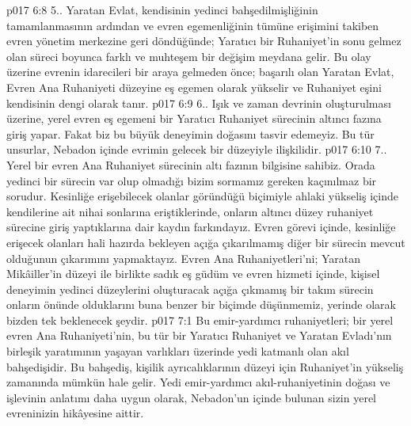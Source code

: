 \vs p017 6:8 5.\bibnobreakspace {}. Yaratan Evlat, kendisinin yedinci bahşedilmişliğinin tamamlanmasının ardından ve evren egemenliğinin tümüne erişimini takiben evren yönetim merkezine geri döndüğünde; Yaratıcı bir Ruhaniyet’in sonu gelmez olan süreci boyunca farklı ve muhteşem bir değişim meydana gelir. Bu olay üzerine evrenin idarecileri bir araya gelmeden önce; başarılı olan Yaratan Evlat, Evren Ana Ruhaniyeti düzeyine eş egemen olarak yükselir ve Ruhaniyet eşini kendisinin dengi olarak tanır.
\vs p017 6:9 6.\bibnobreakspace {}. Işık ve zaman devrinin oluşturulması üzerine, yerel evren eş egemeni bir Yaratıcı Ruhaniyet sürecinin altıncı fazına giriş yapar. Fakat biz bu büyük deneyimin doğasını tasvir edemeyiz. Bu tür unsurlar, Nebadon içinde evrimin gelecek bir düzeyiyle ilişkilidir.
\vs p017 6:10 7.\bibnobreakspace {}. Yerel bir evren Ana Ruhaniyet sürecinin altı fazının bilgisine sahibiz. Orada yedinci bir sürecin var olup olmadığı bizim sormamız gereken kaçınılmaz bir sorudur. Kesinliğe erişebilecek olanlar göründüğü biçimiyle ahlaki yükseliş içinde kendilerine ait nihai sonlarına eriştiklerinde, onların altıncı düzey ruhaniyet sürecine giriş yaptıklarına dair kaydın farkındayız. Evren görevi içinde, kesinliğe erişecek olanları hali hazırda bekleyen açığa çıkarılmamış diğer bir sürecin mevcut olduğunun çıkarımını yapmaktayız. Evren Ana Ruhaniyetleri’ni; Yaratan Mikâiller’in düzeyi ile birlikte sadık eş güdüm ve evren hizmeti içinde, kişisel deneyimin yedinci düzeylerini oluşturacak açığa çıkmamış bir takım sürecin onların önünde olduklarını buna benzer bir biçimde düşünmemiz, yerinde olarak bizden tek beklenecek şeydir.
\vs p017 7:1 Bu emir\hyp{}yardımcı ruhaniyetleri; bir yerel evren Ana Ruhaniyeti’nin, bu tür bir Yaratıcı Ruhaniyet ve Yaratan Evladı’nın birleşik yaratımının yaşayan varlıkları üzerinde yedi katmanlı olan akıl bahşedişidir. Bu bahşediş, kişilik ayrıcalıklarının düzeyi için Ruhaniyet’in yükseliş zamanında mümkün hale gelir. Yedi emir\hyp{}yardımcı akıl\hyp{}ruhaniyetinin doğası ve işlevinin anlatımı daha uygun olarak, Nebadon’un içinde bulunan sizin yerel evreninizin hikâyesine aittir.

